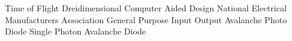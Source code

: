 
	{Time of Flight}
	{Dreidimensional}
	{Computer Aided Design}
	{National Electrical Manufacturers Association}
	{General Purpose Input Output}
	{Avalanche Photo Diode}
	{Single Photon Avalanche Diode}